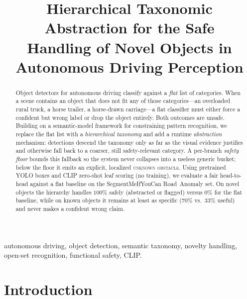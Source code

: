 \documentclass[conference]{IEEEtran}
\begin{document}
\title{Hierarchical Taxonomic Abstraction for the Safe\\
Handling of Novel Objects in Autonomous Driving Perception}

\author{
}

\maketitle

\begin{abstract}
Object detectors for autonomous driving classify against a \emph{flat} list of
categories. When a scene contains an object that does not fit any of those
categories---an overloaded rural truck, a horse trailer, a horse-drawn
carriage---a flat classifier must either force a confident but wrong label or
drop the object entirely. Both outcomes are unsafe. Building on a semantic-model
framework for constraining pattern recognition, we replace the flat list with a
\emph{hierarchical taxonomy} and add a runtime \emph{abstraction} mechanism:
detections descend the taxonomy only as far as the visual evidence justifies and
otherwise fall back to a coarser, still safety-relevant category. A per-branch
\emph{safety floor} bounds this fallback so the system never collapses into a
useless generic bucket; below the floor it emits an explicit, localized
\textsc{unknown obstacle}. Using pretrained YOLO boxes and CLIP zero-shot leaf
scoring (no training), we evaluate a fair head-to-head against a flat baseline on
the SegmentMeIfYouCan Road~Anomaly set. On novel objects the hierarchy handles
$100\%$ safely (abstracted or flagged) versus $0\%$ for the flat baseline, while
on known objects it remains at least as specific ($70\%$ vs.\ $33\%$ useful) and
never makes a confident wrong claim.
\end{abstract}

\begin{IEEEkeywords}
autonomous driving, object detection, semantic taxonomy, novelty handling,
open-set recognition, functional safety, CLIP.
\end{IEEEkeywords}

\section{Introduction}
\label{sec:intro}
\end{document}
